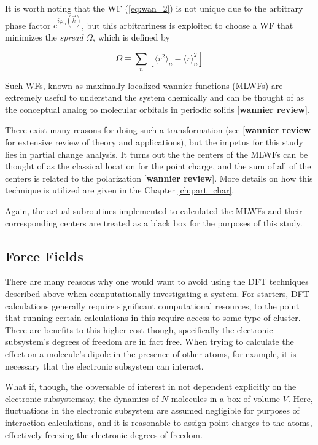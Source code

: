     It is worth noting that the WF (\ref{eq:wan_2}) is not unique due to the arbitrary phase factor $e^{i\varphi_n(\vec{k})}$, but this arbitrariness is exploited to choose a WF that minimizes the \textit{spread} $\Omega$, which is defined by
    
    \begin{equation}
        \Omega \equiv \sum\limits_n \left[ \langle r^2 \rangle_n - \langle r \rangle^2_n \right]
    \end{equation}
    
    \noindent Such WFs, known as maximally localized wannier functions (MLWFs) are extremely useful to understand the system chemically and can be thought of as the conceptual analog to molecular orbitals in periodic solids [\textbf{wannier review}].
    
    
    There exist many reasons for doing such a transformation (see [\textbf{wannier review} for extensive review of theory and applications), but the impetus for this study lies in partial change analysis. It turns out the the centers of the MLWFs can be thought of as the classical location for the point charge, and the sum of all of the centers is related to the polarization [\textbf{wannier review}]. More details on how this technique is utilized are given in the Chapter \ref{ch:part_char}.
    
    Again, the actual subroutines implemented to calculated the MLWFs and their corresponding centers are treated as a black box for the purposes of this study.
    
    \subsection{Force Fields}
    
    There are many reasons why one would want to avoid using the DFT techniques described above when computationally investigating a system. For starters, DFT calculations generally require significant computational resources, to the point that running certain calculations in this require access to some type of cluster. There are benefits to this higher cost though, specifically the electronic subsystem's degrees of freedom are in fact free. When trying to calculate the effect on a molecule's dipole in the presence of other atoms, for example, it is necessary that the electronic subsystem can interact.
    
    What if, though, the obversable of interest in not dependent explicitly on the electronic subsystem\textemdash say, the dynamics of $N$ molecules in a box of volume $V$. Here, fluctuations in the electronic subsystem are assumed negligible for purposes of interaction calculations, and it is reasonable to assign point charges to the atoms, effectively freezing the electronic degrees of freedom. 
    
